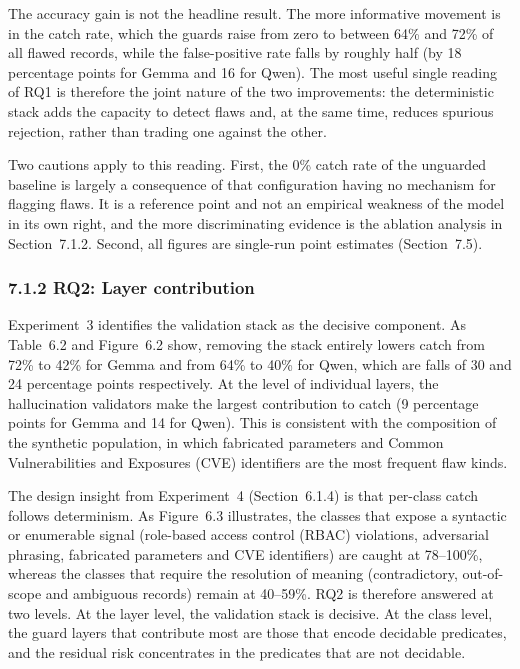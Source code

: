 \documentclass[
]{article}
\begin{document}
The accuracy gain is not the headline result. The more informative
movement is in the catch rate, which the guards raise from zero to
between 64\% and 72\% of all flawed records, while the false-positive
rate falls by roughly half (by 18 percentage points for Gemma and 16 for
Qwen). The most useful single reading of RQ1 is therefore the joint
nature of the two improvements: the deterministic stack adds the
capacity to detect flaws and, at the same time, reduces spurious
rejection, rather than trading one against the other.

Two cautions apply to this reading. First, the 0\% catch rate of the
unguarded baseline is largely a consequence of that configuration having
no mechanism for flagging flaws. It is a reference point and not an
empirical weakness of the model in its own right, and the more
discriminating evidence is the ablation analysis in Section~7.1.2.
Second, all figures are single-run point estimates (Section~7.5).

\hypertarget{rq2-layer-contribution}{%
\subsubsection{7.1.2 RQ2: Layer
contribution}\label{rq2-layer-contribution}}

Experiment~3 identifies the validation stack as the decisive component.
As Table~6.2 and Figure~6.2 show, removing the stack entirely lowers
catch from 72\% to 42\% for Gemma and from 64\% to 40\% for Qwen, which
are falls of 30 and 24 percentage points respectively. At the level of
individual layers, the hallucination validators make the largest
contribution to catch (9 percentage points for Gemma and 14 for Qwen).
This is consistent with the composition of the synthetic population, in
which fabricated parameters and Common Vulnerabilities and Exposures
(CVE) identifiers are the most frequent flaw kinds.

The design insight from Experiment~4 (Section~6.1.4) is that per-class
catch follows determinism. As Figure~6.3 illustrates, the classes that
expose a syntactic or enumerable signal (role-based access control
(RBAC) violations, adversarial phrasing, fabricated parameters and CVE
identifiers) are caught at 78--100\%, whereas the classes that require
the resolution of meaning (contradictory, out-of-scope and ambiguous
records) remain at 40--59\%. RQ2 is therefore answered at two levels. At
the layer level, the validation stack is decisive. At the class level,
the guard layers that contribute most are those that encode decidable
predicates, and the residual risk concentrates in the predicates that
are not decidable.
\end{document}
